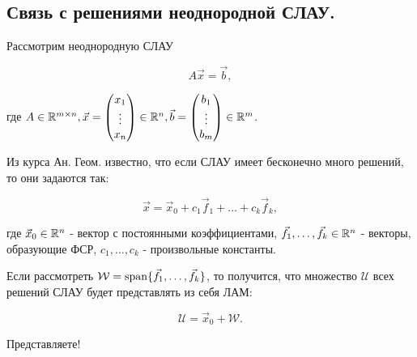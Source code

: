 \subsection{
    Связь с решениями неоднородной СЛАУ.
}

Рассмотрим неоднородную СЛАУ

$$A\vec{x} = \vec{b},$$

где $A \in \mathbb{R}^{m \times n}, \vec{x} = \begin{pmatrix} x_1 \\ \vdots \\ x_n \end{pmatrix} \in \mathbb{R}^n, \vec{b} = \begin{pmatrix} b_1 \\ \vdots \\ b_m \end{pmatrix} \in \mathbb{R}^m$.

Из курса Ан. Геом. известно, что если СЛАУ имеет бесконечно много решений, то они задаются так:

$$\vec{x} = \vec{x}_0 + c_1\vec{f}_1 + \ldots + c_k\vec{f}_k,$$

где $\vec{x}_0 \in \mathbb{R}^n$ - вектор с постоянными коэффициентами, $\vec{f}_1, \ldots, \vec{f}_k \in \mathbb{R}^n$ - векторы, образующие ФСР, $c_1, \ldots, c_k$ - произвольные константы.

Если рассмотреть $\mathcal{W} = \operatorname{\mathop{\mathrm{span}}} \{\vec{f}_1, \ldots, \vec{f}_k\}$, то получится, что множество $\mathcal{U}$ всех решений СЛАУ будет представлять из себя ЛАМ:

$$\mathcal{U} = \vec{x}_0 + \mathcal{W}.$$

Представляете!

